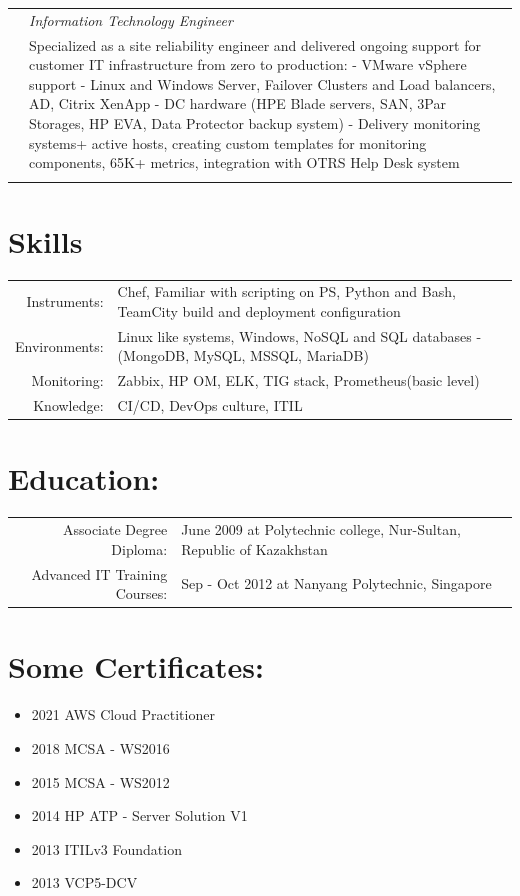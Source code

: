 \documentclass[a4paper,10pt]{article}
\begin{document}
\begin{longtable}{r|p{11cm}}
                                  & \emph{Information Technology Engineer}\\
& \footnotesize{\textnormal{Specialized as a site reliability engineer and delivered ongoing support for customer IT infrastructure from zero to production:\newline
- VMware vSphere support\newline
- Linux and Windows Server, Failover Clusters and Load balancers, AD, Citrix XenApp\newline
- DC hardware (HPE Blade servers, SAN, 3Par Storages, HP EVA, Data Protector backup system)\newline
- Delivery monitoring systems\newline
70+ active hosts, creating custom templates for monitoring components, 65K+ metrics, integration with OTRS Help Desk system}}\\
\multicolumn{2}{c}{} \\
\end{longtable}
\section*{Skills}
\begin{tabular}{r|p{13cm}}
  Instruments: & Chef, Familiar with scripting on PS, Python and Bash, TeamCity build and deployment configuration\\
  Environments: & Linux like systems, Windows, NoSQL and SQL databases - (MongoDB, MySQL, MSSQL, MariaDB)\\
  Monitoring: & Zabbix, HP OM, ELK, TIG stack, Prometheus(basic level)\\
  Knowledge: & CI/CD, DevOps culture, ITIL\\
\end{tabular}
\section*{Education:}
\begin{tabular}{r|p{11cm}}
  Associate Degree Diploma: & June 2009 at Polytechnic college, Nur-Sultan, Republic of Kazakhstan\\
  Advanced IT Training Courses: &  Sep - Oct 2012 at Nanyang Polytechnic, Singapore\\
\end{tabular}
\section*{Some Certificates:}
\begin{itemize}
  \item 2021 AWS Cloud Practitioner
  \item 2018 MCSA - WS2016
  \item 2015 MCSA - WS2012
  \item 2014 HP ATP - Server Solution V1
  \item 2013 ITILv3 Foundation 
  \item 2013 VCP5-DCV
\end{itemize}
\end{document}

